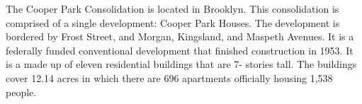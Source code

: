 The Cooper Park Consolidation is located in Brooklyn. This consolidation is comprised of a single development: Cooper Park Houses. The development is bordered by Frost Street, and Morgan, Kingsland, and Maspeth Avenues. It is a federally funded conventional development that finished construction in 1953. It is a made up of eleven residential buildings that are 7- stories tall. The buildings cover 12.14 acres in which there are 696 apartments officially housing 1,538 people.